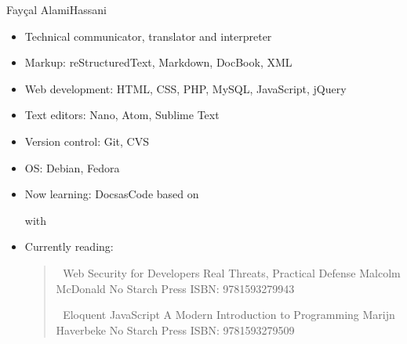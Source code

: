 \documentclass[a4paper,10pt,english,openany,oneside]{sphinxmanual}
\begin{document}
\sphinxAtStartPar
Fayçal Alami\sphinxhyphen{}Hassani \sphinxhyphen{} %
\begin{footnote}[1]\sphinxAtStartFootnote
{}
%
\end{footnote} \sphinxhyphen{} %
\begin{footnote}[2]\sphinxAtStartFootnote
{}
%
\end{footnote}
\begin{itemize}
\item {} 
\sphinxAtStartPar
Technical communicator, translator and interpreter

\item {} 
\sphinxAtStartPar
Markup: reStructuredText, Markdown, DocBook, XML

\item {} 
\sphinxAtStartPar
Web development: HTML, CSS, PHP, MySQL, JavaScript, jQuery

\item {} 
\sphinxAtStartPar
Text editors: Nano, Atom, Sublime Text

\item {} 
\sphinxAtStartPar
Version control: Git, CVS

\item {} 
\sphinxAtStartPar
OS: Debian, Fedora

\item {} 
\sphinxAtStartPar
Now learning: Docs\sphinxhyphen{}as\sphinxhyphen{}Code based on %
\begin{footnote}[3]\sphinxAtStartFootnote
{}
%
\end{footnote} with %
\begin{footnote}[4]\sphinxAtStartFootnote
{}
%
\end{footnote}

\item {} 
\sphinxAtStartPar
Currently reading:
\begin{quote}

\sphinxAtStartPar
📕 Web Security for Developers \sphinxhyphen{} Real Threats, Practical Defense \sphinxhyphen{} Malcolm McDonald \sphinxhyphen{} No Starch Press \sphinxhyphen{} ISBN: 978\sphinxhyphen{}1\sphinxhyphen{}59327\sphinxhyphen{}994\sphinxhyphen{}3

\sphinxAtStartPar
📕 Eloquent JavaScript \sphinxhyphen{} A Modern Introduction to Programming \sphinxhyphen{} Marijn Haverbeke \sphinxhyphen{} No Starch Press \sphinxhyphen{} ISBN: 978\sphinxhyphen{}1\sphinxhyphen{}59327950\sphinxhyphen{}9
\end{quote}

\end{itemize}
\end{document}
